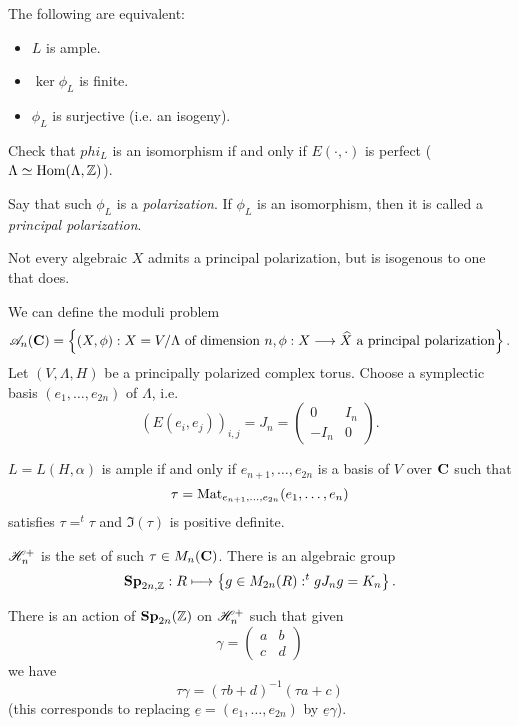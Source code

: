 \begin{theorem}
	The following are equivalent:
	\begin{itemize}
		\item $L$ is ample.
		\item $\ker\phi_L$ is finite.
		\item $\phi_L$ is surjective (i.e. an isogeny).
	\end{itemize}
\end{theorem}
\begin{exercise}
	Check that $phi_L$ is an isomorphism if and only if $E(\cdot ,\cdot )$ is perfect ($\Lambda\simeq \operatorname{Hom}(\Lambda,\mathbb Z)$).
\end{exercise}
\begin{definition}
	Say that such $\phi_L$ is a \emph{polarization}. If $\phi_L$ is an isomorphism, then it is called a \emph{principal polarization}.
\end{definition}
\begin{remark}
	Not every algebraic $X$ admits a principal polarization, but is isogenous to one that does.
\end{remark}
We can define the moduli problem
\[
	\CA_n(\bb{C}) = \left\{ (X,\phi):X = V /\Lambda\text{ of dimension }n,  \phi:X\to \wh{X}\text{ a principal polarization} \right\} 
.\] 
Let $(V,\Lambda,H)$ be a principally polarized complex torus. Choose a symplectic basis $(e_1,\dots,e_{2n})$ of $\Lambda$, i.e.
\[
	(E(e_i,e_j))_{i,j} = J_n = \begin{pmatrix} 0 & I_n \\ -I_n & 0 \end{pmatrix} 
.\] 
\begin{exercise}
	$L=L(H,\alpha)$ is ample if and only if $e_{n+1},\dots,e_{2n}$ is a basis of $V$ over $\mathbf{C}$ such that
	\[
	\tau = \operatorname{Mat}_{e_{n+1},\dots,e_{2n}}(e_1,\dots,e_n)
	\] 
	satisfies $\tau = ^{t}\tau$ and $\Im(\tau)$ is positive definite.
\end{exercise}
\begin{definition}
	$\mathscr{H}_n^{+}$ is the set of such $\tau\in M_n(\mathbf{C})$. There is an algebraic group
	\[
	\Sp_{2n,\Z}:R \mapsto \left\{ g\in M_{2n}(R) : ^{t}gJ_ng = K_n \right\} 
	.\] 
\end{definition}
There is an action of $\mathbf{Sp}_{2n}(\mathbb Z)$ on $\mathscr{H}_n^{+}$ such that given
\[
	\gamma = \begin{pmatrix} a & b \\ c & d \end{pmatrix} 
\] 
we have
\[
\tau \gamma = (\tau b + d)^{-1}(\tau a + c)
\]
(this corresponds to replacing $\underline{e}=(e_1,\dots,e_{2n})$ by $\underline{e}\gamma$).

